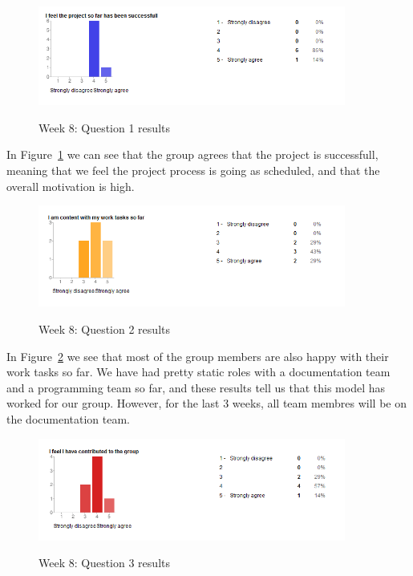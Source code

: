 \begin{figure}[th!]
\caption{Week 8: Question 1 results}
\centering
\includegraphics[width=0.9\textwidth]{evaluation/week_8_images/project_successfull}
\label{fig:W8Q1}
\end{figure}

In Figure~\ref{fig:W8Q1} we can see that the group agrees that the project is successfull, meaning that we feel the project process is going as scheduled, and that the overall motivation is high. 

\begin{figure}[th!]
\caption{Week 8: Question 2 results}
\centering
\includegraphics[width=0.9\textwidth]{evaluation/week_8_images/work_tasks}
\label{fig:W8Q2}
\end{figure}

In Figure~\ref{fig:W8Q2} we see that most of the group members are also happy with their work tasks so far. We have had pretty static roles with a documentation team and a programming team so far, and these results tell us that this model has worked for our group. However, for the last 3 weeks, all team membres will be on the documentation team.

\begin{figure}[th!]
\caption{Week 8: Question 3 results}
\centering
\includegraphics[width=0.9\textwidth]{evaluation/week_8_images/contributed_group}
\label{fig:W8Q3}
\end{figure}

